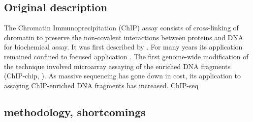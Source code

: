 \subsection{Original description}
The Chromatin Immunoprecipitation (ChIP) assay consists of cross-linking of chromatin to preserve the non-covalent interactions between proteins and DNA for biochemical assay. It was first described by \cite{Solomon1988}. For many years its application remained confined to focused application \cite{Mardis2007}.  
The first genome-wide modification of the technique involved microarray assaying of the enriched DNA fragments (ChIP-chip, \cite{Ren2000}). As massive sequencing has gone down in cost, its application to assaying ChIP-enriched DNA fragments has increased. ChIP-seq \cite{Robertson2007}

\subsection{methodology, shortcomings}




